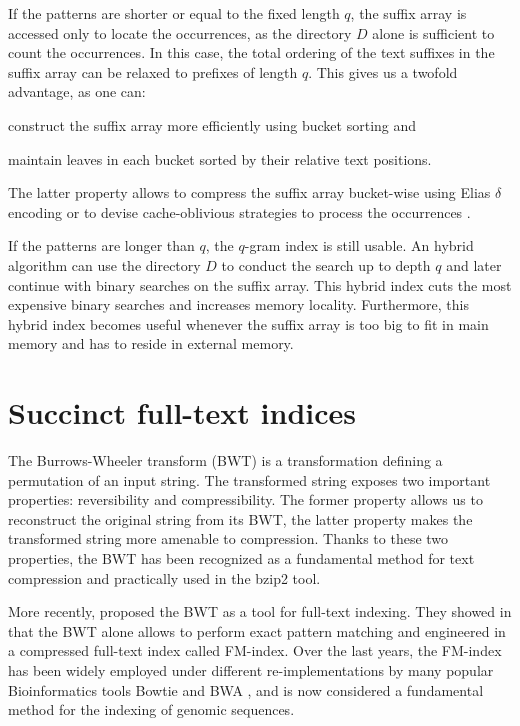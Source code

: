 If the patterns are shorter or equal to the fixed length $q$,  the suffix array is accessed only to locate the occurrences, as the directory $D$ alone is sufficient to count the occurrences.
In this case, the total ordering of the text suffixes in the suffix array can be relaxed to prefixes of length $q$.
This gives us a twofold advantage, as one can:
\begin{inparaenum}[(i)]
\item construct the suffix array more efficiently using bucket sorting and
\item maintain leaves in each bucket sorted by their relative text positions.
\end{inparaenum}
The latter property allows to compress the suffix array bucket-wise \eg using Elias $\delta$ encoding \citep{Elias1975} or to devise cache-oblivious strategies to process the occurrences \citep{Hach2010}.

If the patterns are longer than $q$, the $q$-gram index is still usable.
An hybrid algorithm can use the directory $D$ to conduct the search up to depth $q$ and later continue with binary searches on the suffix array.
This hybrid index cuts the most expensive binary searches and increases memory locality.
Furthermore, this hybrid index becomes useful whenever the suffix array is too big to fit in main memory and has to reside in external memory.

\section{Succinct full-text indices}

The Burrows-Wheeler transform (BWT) \citep{Burrows1994} is a transformation defining a permutation of an input string.
The transformed string exposes two important properties: reversibility and compressibility.
The former property allows us to reconstruct the original string from its BWT, the latter property makes the transformed string more amenable to compression.
Thanks to these two properties, the BWT has been recognized as a fundamental method for text compression and practically used in the bzip2 \citep{Seward1996} tool.

More recently, \citeauthor{Ferragina2000} proposed the BWT as a tool for full-text indexing.
They showed in \citep{Ferragina2000} that the BWT alone allows to perform exact pattern matching and engineered in \citep{Ferragina2001} a compressed full-text index called FM-index.
Over the last years, the FM-index has been widely employed under different re-implementations by many popular Bioinformatics tools \eg Bowtie \citep{Bowtie} and BWA \citep{BWA}, and is now considered a fundamental method for the indexing of genomic sequences.

